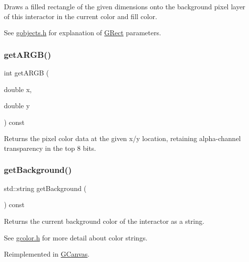 Draws a filled rectangle of the given dimensions onto the background pixel layer of this interactor in the current color and fill color. 

See \mbox{\hyperlink{gobjects_8h_source}{gobjects.\+h}} for explanation of \mbox{\hyperlink{classGRect}{G\+Rect}} parameters. \mbox{\label{classGDrawingSurface_ae394d39f20476570e083918d991c25bd}} 
\subsubsection{\texorpdfstring{get\+A\+R\+G\+B()}{getARGB()}}
{\footnotesize\ttfamily int get\+A\+R\+GB (\begin{DoxyParamCaption}\item[{double}]{x,  }\item[{double}]{y }\end{DoxyParamCaption}) const\hspace{0.3cm}{\ttfamily [virtual]}}



Returns the pixel color data at the given x/y location, retaining alpha-\/channel transparency in the top 8 bits. 

\mbox{\label{classGDrawingSurface_a808e22cc1fdfbecf71ed8c64ef4600e0}} 
\subsubsection{\texorpdfstring{get\+Background()}{getBackground()}}
{\footnotesize\ttfamily std\+::string get\+Background (\begin{DoxyParamCaption}{ }\end{DoxyParamCaption}) const\hspace{0.3cm}{\ttfamily [virtual]}}



Returns the current background color of the interactor as a string. 

See \mbox{\hyperlink{gcolor_8h_source}{gcolor.\+h}} for more detail about color strings. 

Reimplemented in \mbox{\hyperlink{classGCanvas_a4a62c51b7244a7642b88065e3a07ae82}{G\+Canvas}}.

